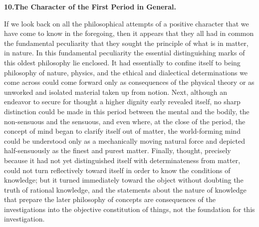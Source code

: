 \divrule

\begin{center}
\textbf{10.\enspace The Character of the First Period in General.}
\end{center}

If we look back on all the philosophical attempts of a positive character
that we have come to know in the foregoing, then it appears that
they all had in common the fundamental peculiarity that they sought the
principle of what is in matter, in nature. In this fundamental peculiarity
the essential distinguishing marks of this oldest philosophy lie enclosed. It
had essentially to confine itself to being philosophy of nature, physics, and
the ethical and dialectical determinations we come across could come forward
only as consequences of the physical theory or as unworked and isolated
material taken up from notion. Next, although an endeavor to secure for
thought a higher dignity early revealed itself, no sharp distinction could be
made in this period between the mental and the bodily, the non-sensuous and
the sensuous, and even where, at the close of the period, the concept of mind
began to clarify itself out of matter, the world-forming mind could be
understood only as a mechanically moving natural force and depicted
half-sensuously as the finest and purest matter. Finally, thought, precisely
because it had not yet distinguished itself with determinateness from matter,
could not turn reflectively toward itself in order to know the conditions of
knowledge; but it turned immediately toward the object without doubting the
truth of rational knowledge, and the statements about the nature of knowledge
that prepare the later philosophy of concepts are consequences of the
investigations into the objective constitution of things, not the foundation
for this investigation.

